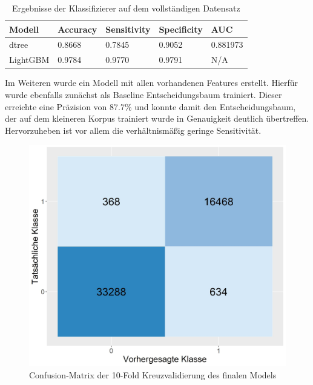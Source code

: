 \begin{table}
    \begin{center}
        \begin{tabularx}{\textwidth}{XXXXX}
            \toprule
            Modell & Accuracy & Sensitivity & Specificity & AUC\\
            \midrule
            dtree & 0.8668 & 0.7845 & 0.9052 & 0.881973 \\
            LightGBM\footnotemark & 0.9784 & 0.9770 & 0.9791 & N/A \\
            \bottomrule
        \end{tabularx}
        \caption{Ergebnisse der Klassifizierer auf dem vollständigen Datensatz}
        \label{full-model}
    \end{center}
\end{table}

Im Weiteren wurde ein Modell mit allen vorhandenen Features erstellt.
Hierfür wurde ebenfalls zunächst als Baseline Entscheidungsbaum trainiert.
Dieser erreichte eine Präzision von 87.7\% und konnte damit den Entscheidungsbaum, der auf dem kleineren Korpus trainiert wurde in Genauigkeit deutlich übertreffen.
Hervorzuheben ist vor allem die verhältnismäßig geringe Sensitivität.

\begin{figure}[ht]
    \centering
    \includegraphics[scale=0.45]{graphics/confusion_matrix.jpg}
    \caption{Confusion-Matrix der 10-Fold Kreuzvalidierung des finalen Models}
    \label{confusion-table}
\end{figure}

